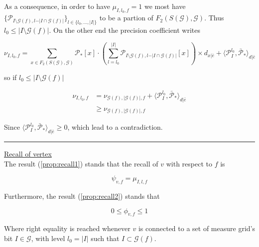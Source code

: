 \documentclass[a4paper, 11pt]{article}
\begin{document}
As a consequence, in order to have $\mu_{I, l_0, f} = 1$ we most have $ \lbrace \mathcal{P}_{I\setminus \mathcal{G}(f), l-\vert I \cap \mathcal{G}(f)\vert} \rbrace_{l \in \{ l_0, \ldots, \vert I \vert \}}$ to be a partion of $F_2(S(\mathcal{G}), \mathcal{G})$. Thus $l_0 \leq \vert I \setminus \mathcal{G}(f) \vert$. On the other end the precision coefficient writes

\begin{equation*}
\nu_{I, l_0, f} = \sum_{x \in F_2(S(\mathcal{G}), \mathcal{G})}  \mathcal{P}_{*}[x] \cdot \left( \sum_{l=l_0}^{\vert I \vert} \mathcal{P}_{I\setminus \mathcal{G}(f), l-\vert I \cap \mathcal{G}(f)\vert} [x] \right) \times d_{x \vert \bar{e}} +  \langle  \mathcal{P}_{I}^{l_0}, \bar{\mathcal{P}}_{*}\rangle_{d \vert \bar{e}}
\end{equation*}

so if $l_0 \leq \vert I \setminus \mathcal{G}(f) \vert$

\begin{align*}
\nu_{I, l_0, f} &=  \nu_{\mathcal{G}(f), \vert \mathcal{G}(f) \vert, f} + \langle  \mathcal{P}_{I}^{l_0}, \bar{\mathcal{P}}_{*}\rangle_{d \vert \bar{e}}\\
&\geq \nu_{\mathcal{G}(f), \vert \mathcal{G}(f) \vert, f}
\end{align*}

Since $\langle  \mathcal{P}_{I}^{l_0}, \bar{\mathcal{P}}_{*}\rangle_{d \vert \bar{e}} \geq 0$, which lead to a contradiction.

\begin{center}
\rule[0pt]{100pt}{1pt} 
\end{center}

\underline{Recall of vertex}\\

The result (\ref{prop:recall1}) stands that the recall of $v$ with respect to $f$ is

\begin{equation*}
\psi_{v, f} = \mu_{I, l, f}
\end{equation*}

Furthermore, the result (\ref{prop:recall2}) stands that 

\begin{equation*}
0 \leq \phi_{v, f} \leq 1
\end{equation*}

Where right equality is reached whenever $v$ is connected to a set of measure grid's bit $I \in \mathcal{G}$, with level $l_0 = \vert I \vert$ such that $I \subset \mathcal{G}(f)$. \\ 
\end{document}
